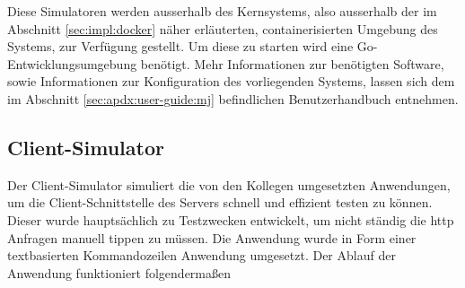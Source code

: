\noindent
Diese Simulatoren werden ausserhalb des Kernsystems, also ausserhalb der im Abschnitt \ref{sec:impl:docker} näher erläuterten, containerisierten Umgebung des Systems, zur Verfügung gestellt. Um diese zu starten wird eine Go-Entwicklungsumgebung benötigt. Mehr Informationen zur benötigten Software, sowie Informationen zur Konfiguration des vorliegenden Systems, lassen sich dem im Abschnitt \ref{sec:apdx:user-guide:mj} befindlichen Benutzerhandbuch entnehmen. 

\subsection{Client-Simulator}\label{sec:impl:simualtion:client}
Der Client-Simulator simuliert die von den Kollegen umgesetzten Anwendungen, um die Client-Schnittstelle des Servers schnell und effizient testen zu können. Dieser wurde hauptsächlich zu Testzwecken entwickelt, um nicht ständig die \acrshort{http} Anfragen manuell tippen zu müssen. Die Anwendung wurde in Form einer textbasierten Kommandozeilen Anwendung umgesetzt. Der Ablauf der Anwendung funktioniert folgendermaßen
